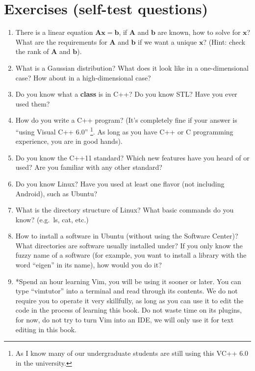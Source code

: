 \section{Exercises (self-test questions)}
\begin{enumerate}
	\item There is a linear equation $\mathbf{Ax}=\mathbf{b}$, if $\mathbf{A}$ and $\mathbf{b}$ are known, how to solve for $\mathbf{x}$? What are the requirements for $\mathbf{A}$ and $\mathbf{b}$ if we want a unique $\mathbf{x}$? (Hint: check the rank of $\mathbf{A}$ and $\mathbf{b}$).
	
	\item What is a Gaussian distribution? What does it look like in a one-dimensional case? How about in a high-dimensional case?
	
	\item Do you know what a \textbf{class} is in C++? Do you know STL? Have you ever used them?
	
	\item How do you write a C++ program? (It's completely fine if your answer is ``using Visual C++ 6.0'' \footnote{As I know many of our undergraduate students are still using this VC++ 6.0 in the university. }. As long as you have C++ or C programming experience, you are in good hands).
	
	\item Do you know the C++11 standard? Which new features have you heard of or used? Are you familiar with any other standard?
	
	\item Do you know Linux? Have you used at least one flavor (not including Android), such as Ubuntu?
	
	\item What is the directory structure of Linux? What basic commands do you know? (e.g.\ ls, cat, etc.)
	
	\item How to install a software in Ubuntu (without using the Software Center)? What directories are software usually installed under? If you only know the fuzzy name of a software (for example, you want to install a library with the word ``eigen'' in its name), how would you do it?
	
	\item *Spend an hour learning Vim, you will be using it sooner or later. You can type ``vimtutor'' into a terminal and read through its contents. We do not require you to operate it very skillfully, as long as you can use it to edit the code in the process of learning this book. Do not waste time on its plugins, for now, do not try to turn Vim into an IDE, we will only use it for text editing in this book.
	
\end{enumerate}
